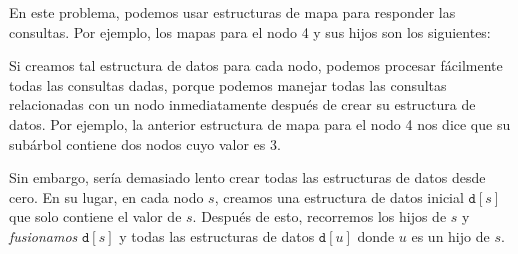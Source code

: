 En este problema, podemos usar estructuras de mapa
para responder las consultas.
Por ejemplo, los mapas para el nodo 4 y
sus hijos son los siguientes:

\begin{center}
\end{center}

Si creamos tal estructura de datos para cada nodo,
podemos procesar fácilmente todas las consultas dadas,
porque podemos manejar todas las consultas relacionadas
con un nodo inmediatamente después de crear su
estructura de datos. Por ejemplo, la anterior
estructura de mapa para el nodo 4
nos dice que su subárbol
contiene dos nodos cuyo valor es 3.

Sin embargo, sería demasiado lento crear
todas las estructuras de datos desde cero.
En su lugar, en cada nodo $s$,
creamos una estructura de datos inicial $\texttt{d}[s]$
que solo contiene el valor de $s$.
Después de esto, recorremos los hijos de $s$ y
\emph{fusionamos} $\texttt{d}[s]$ y
todas las estructuras de datos
$\texttt{d}[u]$ donde $u$ es un hijo de $s$.

